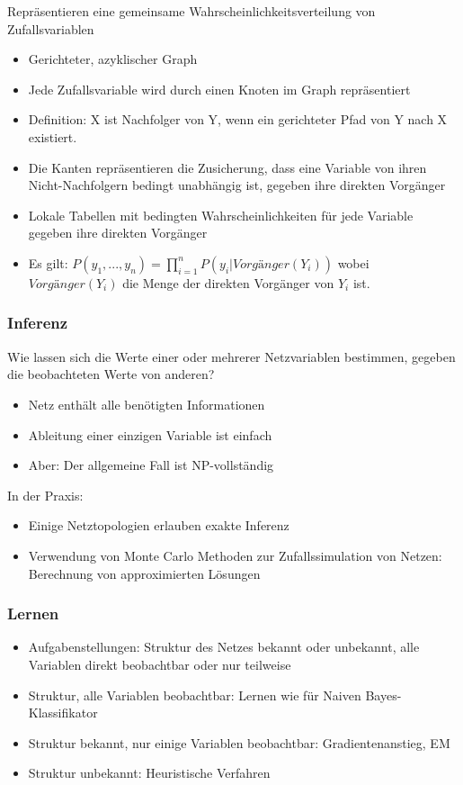 \documentclass[paper=a4, fontsize=11pt]{scrartcl} %
\numberwithin{equation}{section} %
\numberwithin{figure}{section} %
\numberwithin{table}{section} %
\begin{document}
Repräsentieren eine gemeinsame Wahrscheinlichkeitsverteilung von Zufallsvariablen
\begin{itemize}
\item Gerichteter, azyklischer Graph
\item Jede Zufallsvariable wird durch einen Knoten im Graph repräsentiert
\item Definition: X ist Nachfolger von Y, wenn ein gerichteter Pfad von Y nach X existiert.
\item Die Kanten repräsentieren die Zusicherung, dass eine Variable von ihren Nicht-Nachfolgern bedingt unabhängig ist, gegeben ihre direkten Vorgänger
\item Lokale Tabellen mit bedingten Wahrscheinlichkeiten für jede Variable gegeben ihre direkten Vorgänger
\item Es gilt: $P(y_1,...,y_n) = \prod\limits_{i=1}^{n}P(y_i|Vorgänger(Y_i))$ wobei $Vorgänger(Y_i)$ die Menge der direkten Vorgänger von $Y_i$ ist.
\end{itemize}

\subsubsection{Inferenz} 
Wie lassen sich die Werte einer oder mehrerer Netzvariablen bestimmen, gegeben die beobachteten Werte von anderen?
\begin{itemize}
\item Netz enthält alle benötigten Informationen
\item Ableitung einer einzigen Variable ist einfach
\item Aber: Der allgemeine Fall ist NP-vollständig
\end{itemize}

In der Praxis:
\begin{itemize}
\item Einige Netztopologien erlauben exakte Inferenz
\item Verwendung von Monte Carlo Methoden zur Zufallssimulation von Netzen: Berechnung von approximierten Lösungen
\end{itemize}

\subsubsection{Lernen}

\begin{itemize}
\item Aufgabenstellungen: Struktur des Netzes bekannt oder unbekannt, alle Variablen direkt beobachtbar oder nur teilweise
\item Struktur, alle Variablen beobachtbar: Lernen wie für Naiven Bayes-Klassifikator
\item Struktur bekannt, nur einige Variablen beobachtbar: Gradientenanstieg, EM
\item Struktur unbekannt: Heuristische Verfahren
\end{itemize}
\end{document}
